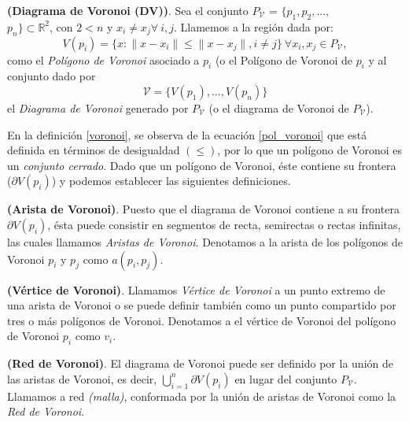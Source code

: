\begin{defn} \textbf{(Diagrama de Voronoi (DV))}. Sea el conjunto $P_{\mathcal{V}}$ = $\{ p_{1}, p_{2}, ...,$ \\ $p_{n} \} \subset \mathbb{R}^{2}$, con $2 < n$ y $x_{i} \neq x_{j} \forall \ i, j$. Llamemos a la región dada por: 
\begin{equation}  
V(p_{i})= \{x : \parallel x-x_{i} \parallel \leq \parallel x-x_{j} \parallel, i \neq j \} \ \forall x_{i}, x_{j} \in P_{\mathcal{V}},
\label{pol_voronoi}
\end{equation}
como el \textit{Polígono de Voronoi} asociado a $p_{i}$ (o el Polígono de Voronoi de $p_{i}$ y al conjunto dado por
\begin{equation}
\mathcal{V} = \{ V(p_{1}),...,V(p_{n}) \}
\end{equation}
el \textit{Diagrama de Voronoi} generado por $P_{\mathcal{V}}$ (o el diagrama de Voronoi de $P_{\mathcal{V}}$). 
\label{voronoi}
\end{defn}

En la definición \ref{voronoi}, se observa de la ecuación \ref{pol_voronoi} que está definida en términos de desigualdad $(\leq)$, por lo que un polígono de Voronoi es un \textit{conjunto cerrado}. Dado que un polígono de Voronoi, éste contiene su frontera ($\partial V(p_{i})$) y podemos establecer las siguientes definiciones.

\begin{defn} \textbf{(Arista de Voronoi)}. Puesto que el diagrama de Voronoi contiene a su frontera $\partial V(p_{i})$, ésta puede consistir en segmentos de recta, semirectas o rectas infinitas, las cuales llamamos \textit{Aristas de Voronoi}. Denotamos a la arista de los polígonos de Voronoi $p_{i}$ y $p_{j}$ como $a (p_{i}, p_{j})$.
\end{defn}

\begin{defn} \textbf{(Vértice de Voronoi)}. Llamamos \textit{Vértice de Voronoi} a un punto extremo de una arista de Voronoi o se puede definir también como un punto compartido por tres o más polígonos de Voronoi. Denotamos a el vértice de Voronoi del polígono de Voronoi $p_{i}$ como $v_{i}$.
\end{defn}

\begin{defn} \textbf{(Red de Voronoi)}. El diagrama de Voronoi puede ser definido por la unión de las aristas de Voronoi, es decir, $\bigcup_{i=1}^{n} \partial V(p_{i})$  en lugar del conjunto $P_{\mathcal{V}}$. Llamamos a red \textit{(malla)}, conformada por la unión de aristas de Voronoi como la \textit{Red de Voronoi}.
\end{defn}





